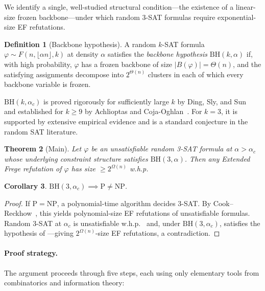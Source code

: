 \documentclass[11pt]{article}
\newtheorem{theorem}{Theorem}[section]
\newtheorem{corollary}[theorem]{Corollary}
\theoremstyle{definition}
\newtheorem{definition}[theorem]{Definition}
\begin{document}
We identify a single, well-studied structural condition---the existence
of a linear-size frozen backbone---under which random 3-SAT formulas
require exponential-size EF refutations.

\begin{definition}[Backbone hypothesis]\label{def:BH}
A random $k$-SAT formula $\varphi \sim F(n, \lfloor \alpha n \rfloor, k)$
at density $\alpha$ satisfies the \emph{backbone hypothesis}
$\mathrm{BH}(k, \alpha)$ if, with high probability, $\varphi$ has a
frozen backbone of size $|B(\varphi)| = \Theta(n)$, and the satisfying
assignments decompose into $2^{\Theta(n)}$ clusters in each of which
every backbone variable is frozen.
\end{definition}

$\mathrm{BH}(k, \alpha_c)$ is proved rigorously for sufficiently large
$k$ by Ding, Sly, and Sun~\cite{DingSly2015} and established for $k
\geq 9$ by Achlioptas and
Coja-Oghlan~\cite{AchlioptasCoja2008}.  For $k = 3$, it is supported
by extensive empirical evidence and is a standard conjecture in the
random SAT literature.

\begin{theorem}[Main]\label{thm:main}
Let $\varphi$ be an unsatisfiable random 3-SAT formula at
$\alpha > \alpha_c$ whose underlying constraint structure satisfies
$\mathrm{BH}(3, \alpha)$.  Then any Extended Frege refutation of
$\varphi$ has size $\geq 2^{\Omega(n)}$ w.h.p.
\end{theorem}

\begin{corollary}\label{cor:PneqNP}
$\mathrm{BH}(3, \alpha_c) \implies \mathrm{P} \neq \mathrm{NP}$.
\end{corollary}

\begin{proof}
If $\mathrm{P} = \mathrm{NP}$, a polynomial-time algorithm decides
3-SAT.  By Cook--Reckhow~\cite{Cook1979}, this yields polynomial-size
EF refutations of unsatisfiable formulas.  Random 3-SAT at $\alpha_c$
is unsatisfiable w.h.p.~\cite{DingSly2015} and, under
$\mathrm{BH}(3, \alpha_c)$, satisfies the hypothesis of
---giving $2^{\Omega(n)}$-size EF refutations, a
contradiction.
\end{proof}

\paragraph{Proof strategy.}
The argument proceeds through five steps, each using only elementary
tools from combinatorics and information theory:
\end{document}
